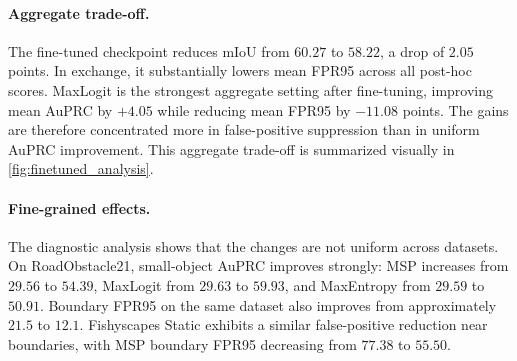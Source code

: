 \begin{table}[t]
\centering
\caption{Effect of cut-and-paste outlier exposure on EoMT. We compare the original EoMT checkpoint against the fine-tuned checkpoint used for the new analysis. Mean AuPRC and Mean FPR95 are averaged over the five OoD benchmarks. Higher AuPRC and lower FPR95 are better.}
\label{tab:finetuning_summary}
\end{table}

\paragraph{Aggregate trade-off.}
The fine-tuned checkpoint reduces mIoU from $60.27$ to $58.22$, a drop of
$2.05$ points. In exchange, it substantially lowers mean FPR95 across all
post-hoc scores. MaxLogit is the strongest aggregate setting after fine-tuning,
improving mean AuPRC by $+4.05$ while reducing mean FPR95 by $-11.08$ points.
The gains are therefore concentrated more in false-positive suppression than in
uniform AuPRC improvement. This aggregate trade-off is summarized visually in
\cref{fig:finetuned_analysis}.

\paragraph{Fine-grained effects.}
The diagnostic analysis shows that the changes are not uniform across datasets.
On RoadObstacle21, small-object AuPRC improves strongly: MSP increases from
$29.56$ to $54.39$, MaxLogit from $29.63$ to $59.93$, and MaxEntropy from
$29.59$ to $50.91$. Boundary FPR95 on the same dataset also improves from
approximately $21.5$ to $12.1$. Fishyscapes Static exhibits a similar
false-positive reduction near boundaries, with MSP boundary FPR95 decreasing
from $77.38$ to $55.50$.

